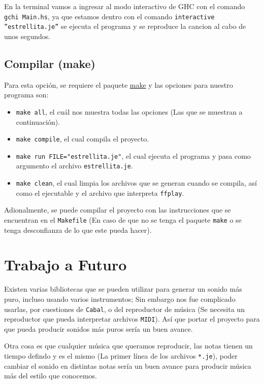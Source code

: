\documentclass[10pt,a4paper]{article}
\begin{document}
En la terminal vamos a ingresar al modo interactivo de GHC con el comando
\texttt{gchi Main.hs}, ya que estamos dentro con el comando
\texttt{interactive ''estrellita.je''} se ejecuta el programa y se reproduce la
cancion al cabo de unos segundos.

\subsection{Compilar (make)}
Para esta opción, se requiere el paquete
\href{https://www.archlinux.org/packages/core/x86\_64/make/}{make} y las opciones
para nuestro programa son:

\begin{itemize}
\item \texttt{make all}, el cuál nos muestra todas las opciones (Las que se
  muestran a continuación).
\item \texttt{make compile}, el cual compila el proyecto.
\item \texttt{make run FILE="estrellita.je"}, el cual ejecuta el programa y pasa
  como argumento el archivo \texttt{estrellita.je}.
\item \texttt{make clean}, el cual limpia los archivos que se generan cuando se
  compila, así como el ejecutable y el archivo que interpreta \texttt{ffplay}.
\end{itemize}

Adionalmente, se puede compilar el proyecto con las instrucciones que se
encuentran en el \texttt{Makefile} (En caso de que no se tenga el paquete
\texttt{make} o se tenga desconfianza de lo que este pueda hacer).

\section{Trabajo a Futuro}
Existen varias bibliotecas\cite{paul} que se pueden utilizar para generar un
sonido más puro, incluso usando varios instrumentos; Sin embargo nos fue
complicado usarlas, por cuestiones de \texttt{Cabal}, o del reproductor de música
(Se necesita un reproductor que pueda interpretar archivos \texttt{MIDI}). Así
que portar el proyecto para que pueda producir sonidos más puros sería un buen
avance.

Otra cosa es que cualquier música que queramos reproducir, las notas tienen un
tiempo defindo y es el mismo (La primer línea de los archivos \texttt{*.je}),
poder cambiar el sonido en distintas notas sería un buen avance para producir
música más del estilo que conocemos.
\end{document}
